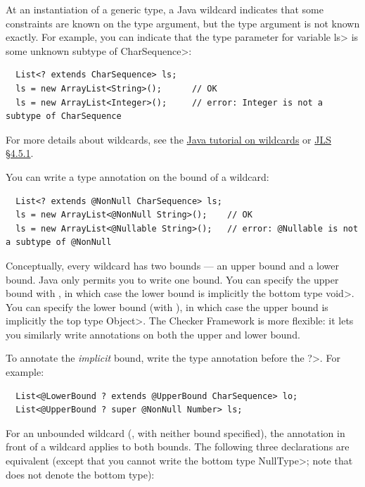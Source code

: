 
At an instantiation of a generic type, a Java wildcard indicates that some
constraints are known on the type argument, but the type argument is not known
exactly.
For example, you can indicate that the type parameter for variable \<ls> is
some unknown subtype of \<CharSequence>:

\begin{Verbatim}
  List<? extends CharSequence> ls;
  ls = new ArrayList<String>();      // OK
  ls = new ArrayList<Integer>();     // error: Integer is not a subtype of CharSequence
\end{Verbatim}

For more details about wildcards, see the
\href{https://docs.oracle.com/javase/tutorial/java/generics/wildcards.html}{Java
  tutorial on wildcards} or
\href{https://docs.oracle.com/javase/specs/jls/se17/html/jls-4.html#jls-4.5.1}{JLS
  \S 4.5.1}.

You can write a type annotation on the bound of a wildcard:

\begin{Verbatim}
  List<? extends @NonNull CharSequence> ls;
  ls = new ArrayList<@NonNull String>();    // OK
  ls = new ArrayList<@Nullable String>();   // error: @Nullable is not a subtype of @NonNull
\end{Verbatim}

Conceptually, every wildcard has two bounds --- an upper bound and a lower
bound.  Java only permits you to write one bound.
You can specify the upper bound with , in which
case the lower bound is implicitly the bottom type \<void>.
You can specify the lower bound (with ), in
which case the upper bound is implicitly the top type \<Object>.
The Checker Framework is more flexible:  it lets you similarly write
annotations on both the upper and lower bound.

To annotate the \emph{implicit} bound, write the type annotation
before the \<?>.  For example:

\begin{Verbatim}
  List<@LowerBound ? extends @UpperBound CharSequence> lo;
  List<@UpperBound ? super @NonNull Number> ls;
\end{Verbatim}

For an unbounded wildcard (, with neither
bound specified), the annotation in front of a wildcard applies
to both bounds.  The following three declarations are equivalent (except
that you cannot write the bottom type \<NullType>; note that
 does not denote the bottom type):

